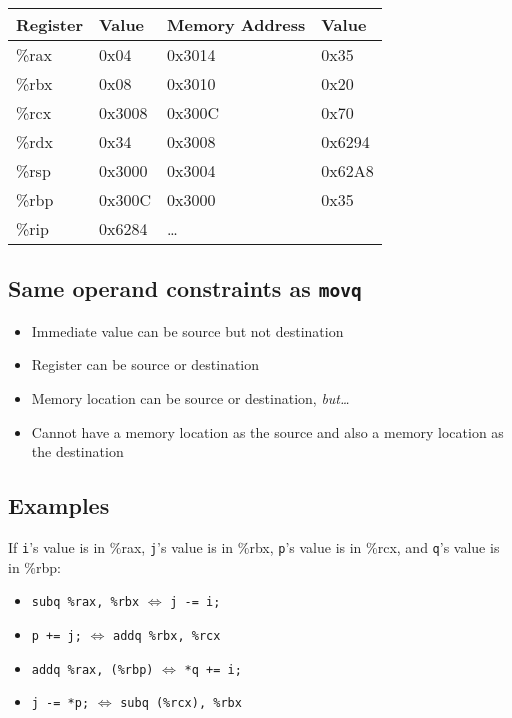 \documentclass{article}
\begin{document}
\begin{tabular}{|l|l||l|l|} \hline
Register & Value & Memory Address & Value \\ \hline
\%rax & 0x04   & 0x3014 & 0x35   \\ \hline
\%rbx & 0x08   & 0x3010 & 0x20   \\ \hline
\%rcx & 0x3008 & 0x300C & 0x70   \\ \hline
\%rdx & 0x34   & 0x3008 & 0x6294 \\ \hline
\%rsp & 0x3000 & 0x3004 & 0x62A8 \\ \hline
\%rbp & 0x300C & 0x3000 & 0x35   \\ \hline
\%rip & 0x6284 & \dots  &        \\ \hline
\end{tabular}

\subsection{Same operand constraints as \texttt{movq}}

\begin{itemize}
\item Immediate value can be source but not destination
\item Register can be source or destination
\item Memory location can be source or destination, \textit{but\dots}
\item Cannot have a memory location as the source and also a memory location as the destination
\end{itemize}

\subsection{Examples}

If \texttt{i}'s value is in \%rax, \texttt{j}'s value is in \%rbx, \texttt{p}'s value is in \%rcx, and \texttt{q}'s value is in \%rbp:

\begin{itemize}
\item \texttt{subq \%rax, \%rbx} $\Leftrightarrow$ \texttt{j -= i;}
\item \texttt{p += j;} $\Leftrightarrow$ \texttt{addq \%rbx, \%rcx}
\item \texttt{addq \%rax, (\%rbp)} $\Leftrightarrow$ \texttt{*q += i;}
\item \texttt{j -= *p;} $\Leftrightarrow$ \texttt{subq (\%rcx), \%rbx}
\end{itemize}
\end{document}

